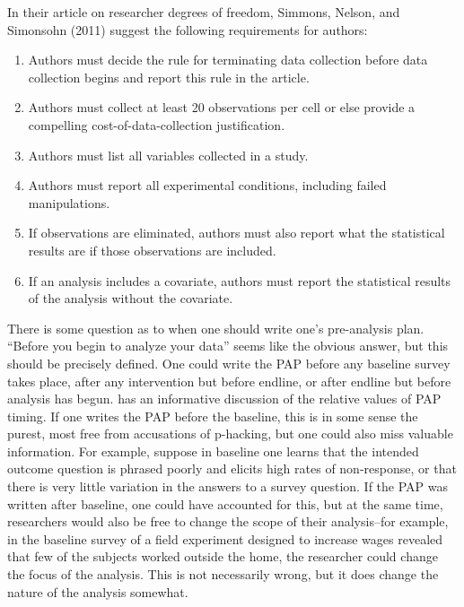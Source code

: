 \documentclass[12pt] {article}
\begin{document}
In their article on researcher degrees of freedom, Simmons, Nelson, and
Simonsohn (2011) suggest the following requirements for authors:

\begin{enumerate}
\def\labelenumi{\arabic{enumi}.}
\item
  Authors must decide the rule for terminating data collection before
  data collection begins and report this rule in the article.
\item
  Authors must collect at least 20 observations per cell or else provide
  a compelling cost-of-data-collection justification.
\item
  Authors must list all variables collected in a study.
\item
  Authors must report all experimental conditions, including failed
  manipulations.
\item
  If observations are eliminated, authors must also report what the
  statistical results are if those observations are included.
\item
  If an analysis includes a covariate, authors must report the
  statistical results of the analysis without the covariate.
\end{enumerate}

There is some question as to when one should write one's pre-analysis plan. ``Before you begin to analyze your data'' seems like the obvious answer, but this should be precisely defined. One could write the PAP before any baseline survey takes place, after any intervention but before endline, or after endline but before analysis has begun. \cite{glennerster_running_2013} has an informative discussion of the relative values of PAP timing. If one writes the PAP before the baseline, this is in some sense the purest, most free from accusations of p-hacking, but one could also miss valuable information. For example, suppose in baseline one learns that the intended outcome question is phrased poorly and elicits high rates of non-response, or that there is very little variation in the answers to a survey question. If the PAP was written after baseline, one could have accounted for this, but at the same time, researchers would also be free to change the scope of their analysis--for example, in the baseline survey of a field experiment designed to increase wages revealed that few of the subjects worked outside the home, the researcher could change the focus of the analysis. This is not necessarily wrong, but it does change the nature of the analysis somewhat.
\end{document}
